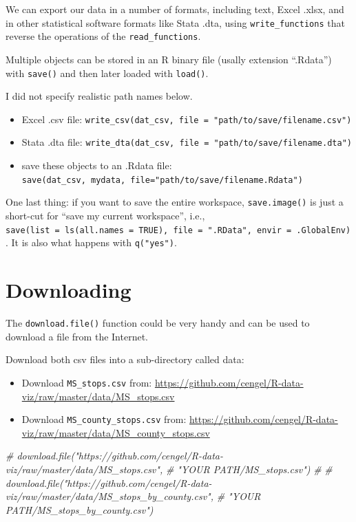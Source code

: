 \documentclass[
]{book}
\newenvironment{Shaded}{\begin{snugshade}}{\end{snugshade}}
\newcommand{\CommentTok}[1]{\textcolor[rgb]{0.56,0.35,0.01}{\textit{#1}}}
\providecommand{\tightlist}{%
  \setlength{\itemsep}{0pt}\setlength{\parskip}{0pt}}
\begin{document}
We can export our data in a number of formats, including text, Excel .xlsx, and in other statistical software formats like Stata .dta, using \texttt{write\_functions} that reverse the operations of the \texttt{read\_functions}.

Multiple objects can be stored in an R binary file (usally extension ``.Rdata'') with \texttt{save()} and then later loaded with \texttt{load()}.

I did not specify realistic path names below.

\begin{itemize}
\tightlist
\item
  Excel .csv file: \texttt{write\_csv(dat\_csv,\ file\ =\ "path/to/save/filename.csv")}
\item
  Stata .dta file: \texttt{write\_dta(dat\_csv,\ file\ =\ "path/to/save/filename.dta")}
\item
  save these objects to an .Rdata file: \texttt{save(dat\_csv,\ mydata,\ file="path/to/save/filename.Rdata")}
\end{itemize}

One last thing: if you want to save the entire workspace, \texttt{save.image()} is just a short-cut for ``save my current workspace'', i.e., \texttt{save(list\ =\ ls(all.names\ =\ TRUE),\ file\ =\ ".RData",\ envir\ =\ .GlobalEnv)}. It is also what happens with \texttt{q("yes")}.

\hypertarget{downloading}{%
\section{Downloading}\label{downloading}}

The \texttt{download.file()} function could be very handy and can be used to download a file from the Internet.

Download both csv files into a sub-directory called data:

\begin{itemize}
\tightlist
\item
  Download \texttt{MS\_stops.csv} from: \url{https://github.com/cengel/R-data-viz/raw/master/data/MS_stops.csv}
\item
  Download \texttt{MS\_county\_stops.csv} from: \url{https://github.com/cengel/R-data-viz/raw/master/data/MS_county_stops.csv}
\end{itemize}

\begin{Shaded}
\begin{Highlighting}[]
\CommentTok{\# download.file("https://github.com/cengel/R{-}data{-}viz/raw/master/data/MS\_stops.csv", }
\CommentTok{\#               "YOUR PATH/MS\_stops.csv")}
\CommentTok{\# }
\CommentTok{\# download.file("https://github.com/cengel/R{-}data{-}viz/raw/master/data/MS\_stops\_by\_county.csv", }
\CommentTok{\#               "YOUR PATH/MS\_stops\_by\_county.csv")}
\end{Highlighting}
\end{Shaded}
\end{document}
